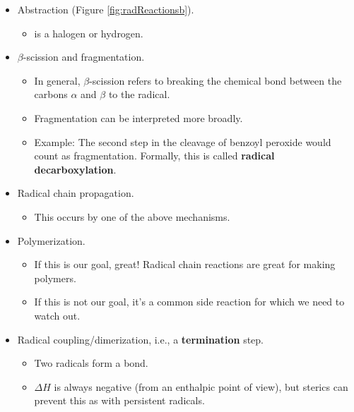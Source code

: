 \documentclass[../notes.tex]{subfiles}
\begin{document}
\begin{itemize}
\begin{itemize}
\begin{itemize}
            \item If it's a cyclization, we follow \textbf{Baldwin's rules}.\footnote{These rules are not covered in this course, but basically, they tell us which radical cyclizations are allowed.}
        \end{itemize}
        \item Abstraction (Figure \ref{fig:radReactionsb}).
        \begin{itemize}
            \item {} is a halogen or hydrogen.
        \end{itemize}
        \item $\beta$-scission and fragmentation.
        \begin{itemize}
            \item In general, $\beta$-scission refers to breaking the chemical bond between the carbons $\alpha$ and $\beta$ to the radical.
            \item Fragmentation can be interpreted more broadly.
            \item Example: The second step in the cleavage of benzoyl peroxide would count as fragmentation. Formally, this is called \textbf{radical decarboxylation}.
        \end{itemize}
        \item Radical chain propagation.
        \begin{itemize}
            \item This occurs by one of the above mechanisms.
        \end{itemize}
        \item Polymerization.
        \begin{itemize}
            \item If this is our goal, great! Radical chain reactions are great for making polymers.
            \item If this is not our goal, it's a common side reaction for which we need to watch out.
        \end{itemize}
        \item Radical coupling/dimerization, i.e., a \textbf{termination} step.
        \begin{itemize}
            \item Two radicals form a bond.
            \item $\Delta H$ is always negative (from an enthalpic point of view), but sterics can prevent this as with persistent radicals.
        \end{itemize}

\end{itemize}
\end{itemize}
\end{document}
